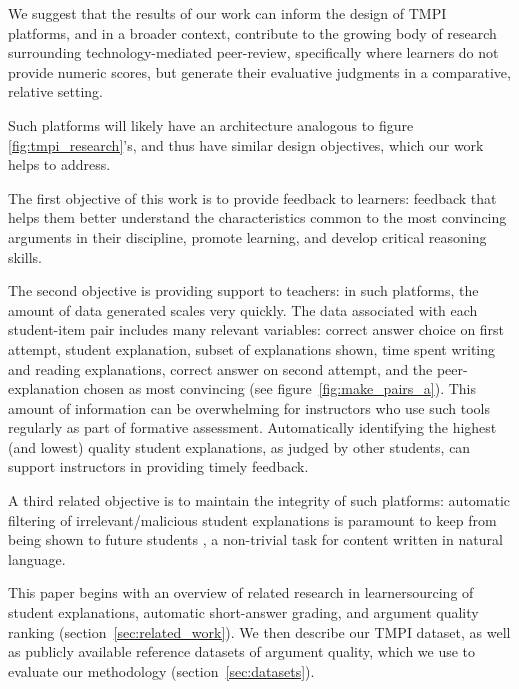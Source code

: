 \documentclass[notitlepage,12pt]{jedm}
\begin{document}

We suggest that the results of our work can inform the design of TMPI 
platforms, and in a broader context, contribute to the growing body of research 
surrounding technology-mediated peer-review, specifically where learners do not 
provide numeric scores, but generate their evaluative judgments in a 
comparative, relative setting. 

Such platforms will likely have an architecture analogous to figure 
\ref{fig:tmpi_research}'s, and thus have similar design objectives, which our 
work helps to address.

The first objective of this work is to provide feedback to learners: feedback that helps 
them better understand the characteristics common to the most convincing 
arguments in their discipline, promote learning, and develop
critical reasoning skills.

The second objective is providing support to teachers: in such platforms, the 
amount of data generated scales very quickly.
The data associated with each student-item pair includes many relevant 
variables: correct answer choice on first attempt, student explanation, subset 
of explanations shown, time spent writing and reading explanations, correct 
answer on second attempt, and the peer-explanation chosen as most convincing 
(see figure~\ref{fig:make_pairs_a}).   
This amount of information can be overwhelming for instructors who use such 
tools regularly as part of formative assessment. 
Automatically identifying the highest (and lowest) quality student 
explanations, as judged by other students, can support instructors in providing 
timely feedback. 

A third related objective is to maintain the integrity of such platforms: 
automatic filtering of irrelevant/malicious student explanations is paramount
to keep from being shown to future students \cite{gagnon_filtering_2019}, a 
non-trivial task for content written in natural language.

This paper begins with an overview of related research in learnersourcing of 
student explanations, automatic short-answer grading, and argument quality 
ranking (section~\ref{sec:related_work}).
We then describe our TMPI dataset, as well as publicly available reference 
datasets of argument quality, which we use to evaluate our methodology (section~\ref{sec:datasets}).
\end{document}
